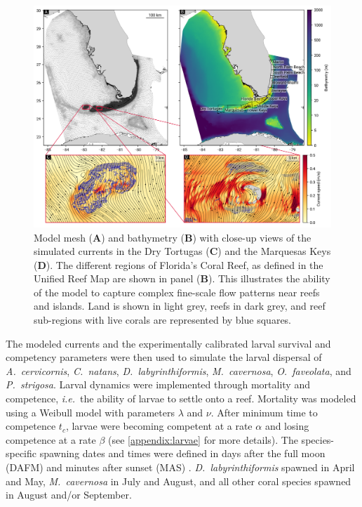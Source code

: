 \documentclass[preprint,12pt,authoryear]{elsarticle}
\newcommand{\ie}{{\it i.e.}\ }
\begin{document}
	\begin{figure}
		\centering
		\includegraphics[width=\textwidth]{figures/fig_mesh_tnc.png}
		\caption{Model mesh (\textbf{A}) and bathymetry (\textbf{B}) with close-up views of the simulated currents in the Dry Tortugas (\textbf{C}) and the Marquesas Keys (\textbf{D}). The different regions of Florida's Coral Reef, as defined in the Unified Reef Map are shown in panel (\textbf{B}). This illustrates the ability of the model to capture complex fine-scale flow patterns near reefs and islands. Land is shown in light grey, reefs in dark grey, and reef sub-regions with live corals are represented by blue squares.}
		\label{fig:mesh}
	\end{figure}
	The modeled currents and the experimentally calibrated larval survival and competency parameters were then used to simulate the larval dispersal of \textit{A.~cervicornis}, \textit{C.~natans}, \textit{D.~labyrinthiformis}, \textit{M.~cavernosa}, \textit{O.~faveolata}, and \textit{P.~strigosa}.  Larval dynamics were implemented through mortality and competence, \ie the ability of larvae to settle onto a reef. Mortality was modeled using a Weibull model \citep{king2023larval} with parameters $\lambda$ and $\nu$. After minimum time to competence $t_c$, larvae were becoming competent at a rate $\alpha$ and losing competence at a rate $\beta$ (see \ref{appendix:larvae} for more details). The species-specific spawning dates and times were defined in days after the full moon (DAFM) and minutes after sunset (MAS) \citep{vermeij2021coral}. \textit{D.~labyrinthiformis} spawned in April and May, \textit{M.~cavernosa} in July and August, and all other coral species spawned in August and/or September.
\end{document}
